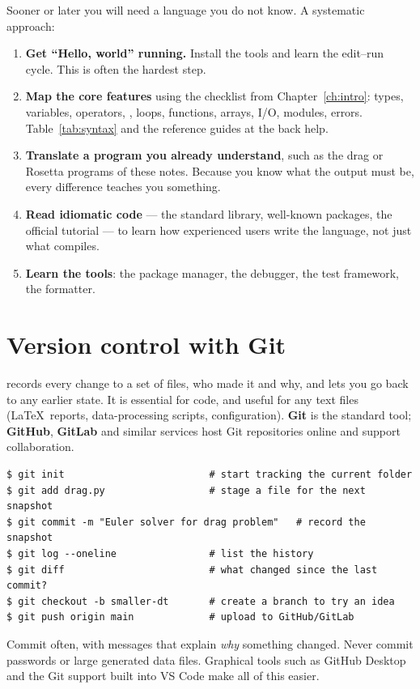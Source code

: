 Sooner or later you will need a language you do not know. A systematic approach:
\begin{enumerate}
\item \textbf{Get ``Hello, world'' running.} Install the tools and learn the
  edit--run cycle. This is often the hardest step.
\item \textbf{Map the core features} using the checklist from Chapter~\ref{ch:intro}:
  types, variables, operators, , loops, functions, arrays, I/O, modules, errors.
  Table~\ref{tab:syntax} and the reference guides at the back help.
\item \textbf{Translate a program you already understand}, such as the drag or Rosetta
  programs of these notes. Because you know what the output must be, every difference
  teaches you something.
\item \textbf{Read idiomatic code} --- the standard library, well-known packages, the
  official tutorial --- to learn how experienced users write the language, not just what
  compiles.
\item \textbf{Learn the tools}: the package manager, the debugger, the test framework, the
  formatter.
\end{enumerate}

\section{Version control with Git}

 records every change to a set of files, who made it and why, and
lets you go back to any earlier state. It is essential for code, and useful for any text
files (\LaTeX\ reports, data-processing scripts, configuration). \textbf{Git} is the
standard tool; \textbf{GitHub}, \textbf{GitLab} and similar services host Git
repositories online and support collaboration.
\begin{lstlisting}[style=shell]
$ git init                         # start tracking the current folder
$ git add drag.py                  # stage a file for the next snapshot
$ git commit -m "Euler solver for drag problem"   # record the snapshot
$ git log --oneline                # list the history
$ git diff                         # what changed since the last commit?
$ git checkout -b smaller-dt       # create a branch to try an idea
$ git push origin main             # upload to GitHub/GitLab
\end{lstlisting}
Commit often, with messages that explain \emph{why} something changed. Never commit
passwords or large generated data files. Graphical tools such as GitHub Desktop and the Git
support built into VS Code make all of this easier.

